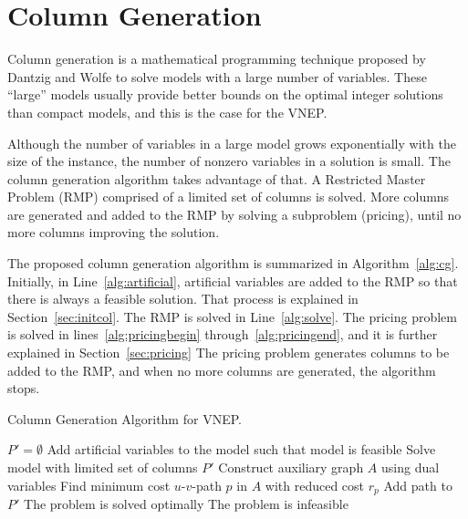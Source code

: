 \chapter{Column Generation}
\label{ch:cg}

Column generation is a mathematical programming technique proposed by Dantzig and Wolfe \cite{Dantzig:1960} 
to solve models with a large number of variables.
These ``large'' models usually provide better bounds on the optimal integer solutions than compact models, and this is the case for the VNEP.

Although the number of variables in a large model grows exponentially with the size of the instance,
the number of nonzero variables in a solution is small.
The column generation algorithm takes advantage of that.
A Restricted Master Problem (RMP) comprised of a limited set of columns is solved.
More columns are generated and added to the RMP by solving a subproblem (pricing), until no more columns improving the solution.

The proposed column generation algorithm is summarized in Algorithm~\ref{alg:cg}.
Initially, in Line~\ref{alg:artificial}, artificial variables are added to the RMP so that there is always a feasible solution.
That process is explained in Section~\ref{sec:initcol}.
The RMP is solved in Line~\ref{alg:solve}.
The pricing problem is solved in lines~\ref{alg:pricingbegin} through~\ref{alg:pricingend},
and it is further explained in Section~\ref{sec:pricing}
The pricing problem generates columns to be added to the RMP, and when no more columns are generated, the algorithm stops.

\begin{algorithm}
\caption{Column Generation Algorithm for VNEP.}
$P' = \emptyset$\;
Add artificial variables to the model such that model is feasible\; \label{alg:artificial}
  {Solve model with limited set of columns $P'$\; \label{alg:solve}
    {Construct auxiliary graph $A$ using dual variables\; \label{alg:aux}
    Find minimum cost $u$-$v$-path $p$ in $A$ with reduced cost $r_{p}$\; \label{alg:findpaths}
      {Add path to $P'$\;}
    } \label{alg:pricingend}
  }
  {The problem is solved optimally\;}
  {The problem is infeasible\;}
\label{alg:cg}
\end{algorithm}

